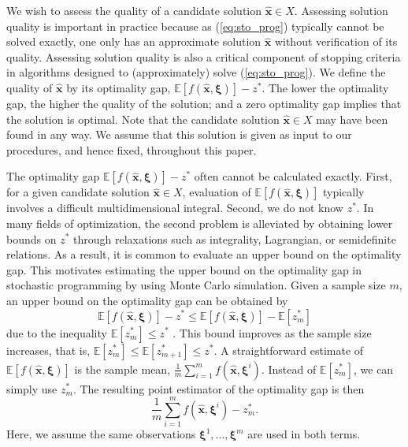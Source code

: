\documentclass[12pt]{article}
\newcommand{\e}[1]{\mathbb{E} \left[ #1 \right]
}
\newcommand{\x}{\mathbf{x}}
\newcommand{\xh}{{\hat{\x}}}
\newcommand{\xit}{\boldsymbol{\xi}}
\newcommand{\xiti}{\xit^i}
\newcommand{\zs}{z^*}
\begin{document}
We wish to assess the quality of a candidate solution $\xh \in X$. 
Assessing solution quality is important in practice because as (\ref{eq:sto_prog}) typically cannot be solved exactly, one only has an approximate solution $\xh$ without verification of its quality.
Assessing solution quality is also a critical component of stopping criteria in algorithms designed to (approximately) solve (\ref{eq:sto_prog}).
We define the quality of $\xh$ by its optimality gap, $\e{f(\xh,\xit)} - \zs$. 
The lower the optimality gap, the higher the quality of the solution; and a zero optimality gap implies that the solution is optimal. 
Note that the candidate solution $\xh \in X$ may have been found in any way. 
We assume that this solution is given as input to our procedures, and hence fixed, throughout this paper. 


The optimality gap $\e{f(\xh,\xit)} - \zs$ often cannot be calculated exactly. First, for a given candidate solution $\xh \in X$, evaluation of $\e{f(\xh,\xit)}$ typically involves a difficult multidimensional integral. 
Second, we do not know $\zs$. 
In many fields of optimization, the second problem is alleviated by obtaining lower bounds on $\zs$ through relaxations such as integrality, Lagrangian, or semidefinite relations.
As a result, it is common to evaluate an upper bound on the optimality gap. 
This motivates estimating the upper bound on the optimality gap in stochastic programming by using Monte Carlo simulation.
Given a sample size $m$, an upper bound on the optimality gap can be obtained by $$
\e{f(\xh,\xit)} - \zs \leq \e{f(\xh,\xit)} - \e{\zs_m}
$$ 
due to the inequality $\e{\zs_m} \leq \zs$ \citep{Mak1999,norkin_pflug_ruszczynski_98}.
This bound improves as the sample size increases, that is, $\e{\zs_m} \leq \e{\zs_{m+1}} \leq \zs$.  
A straightforward estimate of $\e{f(\xh,\xit)}$ is the sample mean, $\frac{1}{m} \sum_{i=1}^m f(\xh,\xiti)$. 
Instead of $\e{\zs_m}$, we can simply use $\zs_m$.  
The resulting point estimator of the optimality gap is then 
$$
\frac{1}{m} \sum_{i=1}^m f(\xh,\xiti) - \zs_m.
$$ 
Here, we assume the same observations $\xit^1, \dots, \xit^m$ are used in both terms.  
\end{document}
